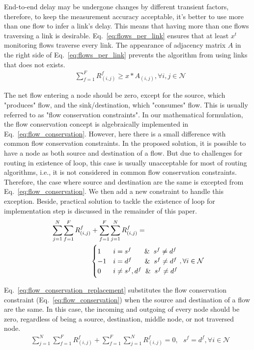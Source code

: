 \documentclass[10pt, journal, letterpaper]{IEEEtran}
\begin{document}
End-to-end delay may be undergone changes by different transient factors, therefore, to keep the measurement accuracy acceptable, it's better to use more than one flow to infer a link's delay. This means that having more than one flows traversing a link is desirable. Eq.~\ref{eq:flows_per_link} ensures that at least $x^t$ monitoring flows traverse every link. The appearance of adjacency matrix $A$ in the right side of Eq.~\ref{eq:flows_per_link} prevents the algorithm from using links that does not exists.
\begin{align}
    & \sum_{f=1}^{F}{R_{(i,j)}^{f}}\geq x*A_{(i,j)},   \forall i,j \in \mathcal{N} \label{eq:flows_per_link}
\end{align}

The net flow entering a node should be zero, except for the source, which "produces" flow, and the sink/destination, which "consumes" flow. This is usually referred to as "flow conservation constraints". In our mathematical formulation, the flow conservation concept is algebraically implemented in  Eq.~\ref{eq:flow_conservation}. However, here there is a small difference with common flow conservation constraints. In the proposed solution, it is possible to have a node as both source and destination of a flow. But due to challenges for routing in existence of loop, this case is usually unacceptable for most of routing algorithms, i.e., it is not considered in common flow conservation constraints. Therefore, the case where source and destination are the same is excepted from Eq.~\ref{eq:flow_conservation}. We then add a new constraint to handle this exception. Beside, practical solution to tackle the existence of loop for implementation step is discussed in the remainder of this paper.
\begin{align} \label{eq:flow_conservation}
    & \sum_{j=1}^N{\sum_{f=1}^F{R_{(i,j)}^{f}}}+\sum_{f=1}^F{\sum_{j=1}^N{R_{(i,j)}^{f}}}=\\\nonumber
    &~~~~~~~~~~~~~~~~~ \begin{cases}
                     1 & i=s^f~~~~ \And s^f\neq d^f\\
                    -1 & i=d^f~~~~ \And s^f\neq d^f\\
                     0 & i\neq s^f,d^f \And s^f\neq d^f\\
                    \end{cases},  \forall i \in \mathcal{N}
\end{align}

Eq.~\ref{eq:flow_conservation_replacement} substitutes the flow conservation constraint (Eq.~\ref{eq:flow_conservation}) when the source and destination of a flow are the same. In this case, the incoming and outgoing of every node should be zero, regardless of being a source, destination, middle node, or not traversed node.
\begin{align}
    & \sum_{j=1}^N{\sum_{f=1}^F{R_{(i,j)}^{f}}}+\sum_{f=1}^F{\sum_{j=1}^N{R_{(i,j)}^{f}}}= 0,~~~ s^f=d^f, \forall i \in \mathcal{N} \label{eq:flow_conservation_replacement} 
\end{align}
\end{document}

